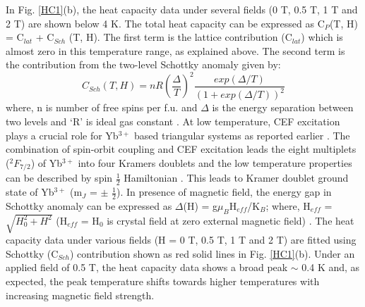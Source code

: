 \documentclass[aps,prl,reprint,showpacs,showkeys,superscriptaddress,floatfix,twocolumn]{revtex4-2}
\begin{document}
In Fig. \ref{HC1}(b), the heat capacity data under several fields (0 T, 0.5 T, 1 T and 2 T) are shown below 4 K. The total heat capacity can be expressed as C$_P$(T, H) = C$_{lat}$ + C$_{Sch}$ (T, H). The first term is the lattice contribution (C$_{lat}$) which is almost zero in this temperature range, as explained above. The second term is the contribution from the two-level  Schottky anomaly given by:
\begin{equation}
\label{Sch}
C_{Sch}(T, H) = nR(\frac{\Delta}{T})^2\frac{exp(\Delta/T)}{(1 + exp(\Delta/T))^2}
\end{equation}
where, n is number of free spins per f.u. and $\Delta$ is the energy separation between two levels and `R' is ideal gas constant \cite{GangPRB2007,WangPRB2007,MuPRB2007,AdhikariPRB2019}. At low temperature, CEF excitation plays a crucial role for Yb$^{3+}$ based triangular systems as reported earlier \cite{LiPRB2016,DingPRB2019,RanjithPRB2019, LiPRL2017}. The combination of spin-orbit coupling and CEF excitation leads the eight multiplets ($^2F_{7/2}$) of Yb$^{3+}$ into four Kramers doublets \cite{DingPRB2019, LiPRL2017, RauPRL2016} and the low temperature properties can be described by spin $\frac{1}{2}$ Hamiltonian \cite{DingPRB2019}. This leads to Kramer doublet ground state of Yb$^{3+}$ (m$_J$ = $\pm$ $\frac{1}{2}$). In presence of magnetic field, the energy gap in Schottky anomaly can be expressed as $\Delta$(H) = g$\mu_B$H$_{eff}$/K$_B$; where, H$_{eff}$ = $\sqrt{H_0^2 + H^2}$ (H$_{eff}$ = H$_0$ is crystal field at zero external magnetic field) \cite{XiePhysica2012,WangPRB2007, MuPRB2007, AkbariJPCM2008}. The heat capacity data under various fields (H = 0 T, 0.5 T, 1 T and 2 T) are fitted using Schottky (C$_{Sch}$) contribution shown as red solid lines in Fig. \ref{HC1}(b). Under an applied field of 0.5 T, the heat capacity data shows a broad peak $\sim$ 0.4 K and, as expected, the peak temperature shifts towards higher temperatures with increasing magnetic field strength. 
\end{document}
